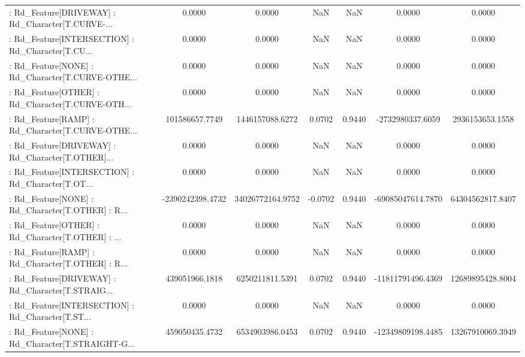 \begin{longtable}{p{4cm}cccccc}
 : Rd\_Feature[DRIVEWAY] : Rd\_Character[T.CURVE-... &            0.0000 &            0.0000 &     NaN &          NaN &             0.0000 &            0.0000 \\
 : Rd\_Feature[INTERSECTION] : Rd\_Character[T.CU... &            0.0000 &            0.0000 &     NaN &          NaN &             0.0000 &            0.0000 \\
 : Rd\_Feature[NONE] : Rd\_Character[T.CURVE-OTHE... &            0.0000 &            0.0000 &     NaN &          NaN &             0.0000 &            0.0000 \\
 : Rd\_Feature[OTHER] : Rd\_Character[T.CURVE-OTH... &            0.0000 &            0.0000 &     NaN &          NaN &             0.0000 &            0.0000 \\
 : Rd\_Feature[RAMP] : Rd\_Character[T.CURVE-OTHE... &    101586657.7749 &   1446157088.6272 &  0.0702 &       0.9440 &   -2732980337.6059 &   2936153653.1558 \\
 : Rd\_Feature[DRIVEWAY] : Rd\_Character[T.OTHER]... &            0.0000 &            0.0000 &     NaN &          NaN &             0.0000 &            0.0000 \\
 : Rd\_Feature[INTERSECTION] : Rd\_Character[T.OT... &            0.0000 &            0.0000 &     NaN &          NaN &             0.0000 &            0.0000 \\
 : Rd\_Feature[NONE] : Rd\_Character[T.OTHER] : R... &  -2390242398.4732 &  34026772164.9752 & -0.0702 &       0.9440 &  -69085047614.7870 &  64304562817.8407 \\
 : Rd\_Feature[OTHER] : Rd\_Character[T.OTHER] : ... &            0.0000 &            0.0000 &     NaN &          NaN &             0.0000 &            0.0000 \\
 : Rd\_Feature[RAMP] : Rd\_Character[T.OTHER] : R... &            0.0000 &            0.0000 &     NaN &          NaN &             0.0000 &            0.0000 \\
 : Rd\_Feature[DRIVEWAY] : Rd\_Character[T.STRAIG... &    439051966.1818 &   6250211811.5391 &  0.0702 &       0.9440 &  -11811791496.4369 &  12689895428.8004 \\
 : Rd\_Feature[INTERSECTION] : Rd\_Character[T.ST... &            0.0000 &            0.0000 &     NaN &          NaN &             0.0000 &            0.0000 \\
 : Rd\_Feature[NONE] : Rd\_Character[T.STRAIGHT-G... &    459050435.4732 &   6534903986.0453 &  0.0702 &       0.9440 &  -12349809198.4485 &  13267910069.3949 \\

\end{longtable}

